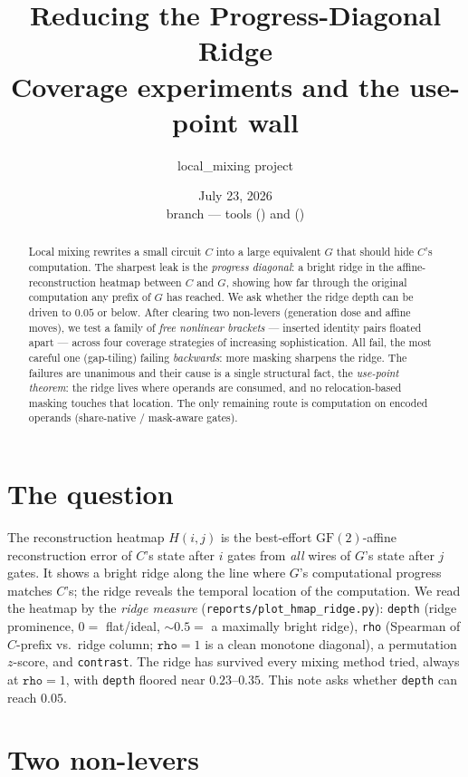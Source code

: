 \documentclass[11pt]{article}
\title{\textbf{Reducing the Progress-Diagonal Ridge}\\[2pt]
\large Coverage experiments and the use-point wall}
\author{local\_mixing project}
\date{July 23, 2026 \\ \small branch \code{ssg-gen-mix-clean} --- tools
\code{fmix --gen-snap-every} (\code{49cee4c8}) and
\code{experimental/mixing/pairfloat\_exp.rs} (\code{5a9f449c})}
\newcommand{\code}[1]{\texttt{#1}}
\newcommand{\gf}{\mathrm{GF}(2)}
\begin{document}
\maketitle

\begin{abstract}
\noindent Local mixing rewrites a small circuit $C$ into a large equivalent
$G$ that should hide $C$'s computation. The sharpest leak is the
\emph{progress diagonal}: a bright ridge in the affine-reconstruction heatmap
between $C$ and $G$, showing how far through the original computation any
prefix of $G$ has reached. We ask whether the ridge depth can be driven to
$0.05$ or below. After clearing two non-levers (generation dose and affine
moves), we test a family of \emph{free nonlinear brackets} --- inserted
identity pairs floated apart --- across four coverage strategies of increasing
sophistication. All fail, the most careful one (gap-tiling) failing
\emph{backwards}: more masking sharpens the ridge. The failures are unanimous
and their cause is a single structural fact, the \emph{use-point theorem}: the
ridge lives where operands are consumed, and no relocation-based masking
touches that location. The only remaining route is computation on encoded
operands (share-native / mask-aware gates).
\end{abstract}

\section{The question}

The reconstruction heatmap $H(i,j)$ is the best-effort $\gf$-affine
reconstruction error of $C$'s state after $i$ gates from \emph{all} wires of
$G$'s state after $j$ gates. It shows a bright ridge along the line where $G$'s
computational progress matches $C$'s; the ridge reveals the temporal location
of the computation. We read the heatmap by the \emph{ridge measure}
(\code{reports/plot\_hmap\_ridge.py}): \code{depth} (ridge prominence,
$0=$ flat/ideal, ${\sim}0.5=$ a maximally bright ridge), \code{rho} (Spearman
of $C$-prefix vs.\ ridge column; $\code{rho}=1$ is a clean monotone diagonal),
a permutation $z$-score, and \code{contrast}. The ridge has survived every
mixing method tried, always at $\code{rho}=1$, with \code{depth} floored near
$0.23$--$0.35$. This note asks whether \code{depth} can reach $0.05$.

\section{Two non-levers}
\end{document}
